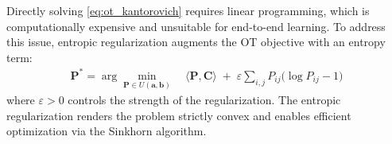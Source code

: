 Directly solving \cref{eq:ot_kantorovich} requires linear programming, which is
computationally expensive and unsuitable for end-to-end learning.
To address this issue, entropic regularization augments the OT objective with an
entropy term:
\begin{equation}
\label{eq:entropic_ot}
\begin{aligned}
\mathbf{P}^* = \arg\min_{\mathbf{P}\in{U}(\mathbf{a},\mathbf{b})}
\ & \langle \mathbf{P},\mathbf{C}\rangle
\;+\;
\varepsilon
\sum_{i,j}{P}_{ij}\big(\log{P}_{ij}-1\big)
\end{aligned}
\end{equation}
where $\varepsilon>0$ controls the strength of the regularization. The entropic regularization renders the problem strictly convex and enables efficient optimization via the Sinkhorn algorithm.
